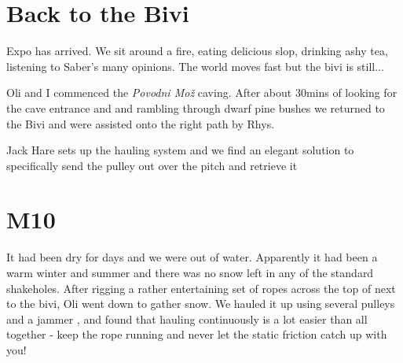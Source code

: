 \section{Back to the Bivi}


Expo has arrived. We sit around a fire, eating delicious slop, drinking ashy tea, listening to Saber's many opinions. The world moves fast but the bivi is still...

Oli and I commenced the \emph{Povodni Mo\v{z}} caving. After about 30mins of looking for the cave entrance and and rambling through dwarf pine bushes we returned to the Bivi and were assisted onto the right path by Rhys.

\begin{marginfigure}
\checkoddpage \ifoddpage \forcerectofloat \else \forceversofloat \fi
\centering
 \caption{Jack Hare sets up the hauling system and we find an elegant solution to specifically send the pulley out over the pitch and retrieve it }
 \label{M10haul}
\end{marginfigure}

\section{M10}
It had been dry for days and we were out of water. Apparently it had been a warm winter and summer and there was no snow left in any of the standard shakeholes. After rigging a rather entertaining set of ropes across the top of  next to the bivi, Oli went down to gather snow. We hauled it up using several pulleys and a jammer , and found that hauling continuously is a lot easier than all together - keep the rope running and never let the static friction catch up with you!


